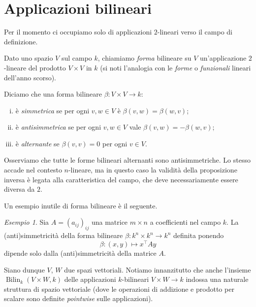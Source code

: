 \documentclass[a4paper]{amsproc}
\newcommand{\en}[1]{\foreignlanguage{english}{\em #1}}
\theoremstyle{plain}
\theoremstyle{definition}
\theoremstyle{remark}
\newtheorem{esempio}[prp]{Esempio}
\DeclareMathOperator{\Bilin}{Bilin}
\begin{document}

\smallskip
\clearpage


\section{Applicazioni bilineari}
Per il momento ci occupiamo solo di applicazioni $ 2 $-lineari verso il campo di definizione.

Dato uno spazio $ V $ sul campo $ k $, chiamiamo \emph{forma} bilineare su $ V $ un'applicazione $ 2 $-lineare del prodotto $ V\times V $ in $ k $ (si noti l'analogia con le \emph{forme} o \emph{funzionali} lineari dell'anno scorso).

Diciamo che una forma bilineare $ \beta\colon V\times V\to k $:
\begin{enumerate}[(i)]
\item è \emph{simmetrica} se per ogni $ v,w\in V $ è $ \beta(v,w) = \beta(w,v) $;
\item è \emph{antisimmetrica} se per ogni $ v,w\in V $ vale $ \beta(v,w) = -\beta(w,v) $;
\item è \emph{alternante} se $ \beta(v,v) = 0 $ per ogni $ v\in V $.
\end{enumerate}

Osserviamo che tutte le forme bilineari alternanti sono antisimmetriche. Lo stesso accade nel contesto $ n $-lineare, ma in questo caso la validità della proposizione inversa è legata alla caratteristica del campo, che deve necessariamente essere diversa da $ 2 $.

Un esempio inutile di forma bilineare è il seguente.

\begin{esempio}
  Sia $ A = \left(a_{ij}\right)_{ij} $ una matrice $ m\times n $ a coefficienti nel campo $ k $. La (anti)simmetricità della forma bilineare $ \beta\colon k^n\times k^n\to k^n $ definita ponendo
  \[
    \beta\colon(x,y)\mapsto x^\intercal Ay
  \]
  dipende solo dalla (anti)simmetricità della matrice $ A $.
\end{esempio}

Siano dunque $ V $, $ W $ due spazi vettoriali. Notiamo innanzitutto che anche l'insieme $ \Bilin_k(V\times W,k) $ delle applicazioni $ k $-bilineari $ V\times W\to k $ indossa una naturale struttura di spazio vettoriale (dove le operazioni di addizione e prodotto per scalare sono definite \en{pointwise} sulle applicazioni).
\end{document}
